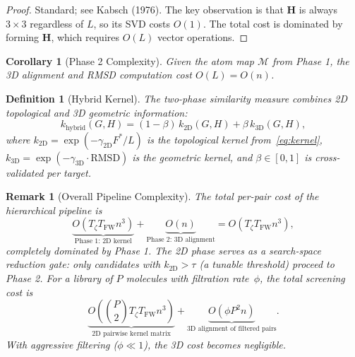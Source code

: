 \documentclass[conference]{IEEEtran}
\newtheorem{corollary}{Corollary}
\newtheorem{remark}{Remark}
\newtheorem{definition}{Definition}
\begin{document}
\begin{proof}
Standard; see Kabsch (1976).
The key observation is that $\mathbf{H}$ is always $3 \times 3$
regardless of $L$, so its SVD costs $O(1)$.
The total cost is dominated by forming $\mathbf{H}$, which
requires $O(L)$ vector operations.
\end{proof}

\begin{corollary}[Phase 2 Complexity]
\label{cor:stage2}
Given the atom map $\mathcal{M}$ from Phase 1, the 3D
alignment and RMSD computation cost $O(L) = O(n)$.
\end{corollary}

\begin{definition}[Hybrid Kernel]
\label{def:hybrid}
The two-phase similarity measure combines 2D topological
and 3D geometric information:
\begin{equation}
k_{\text{hybrid}}(G, H)
  = (1 - \beta)\, k_{\text{2D}}(G, H)
  + \beta\, k_{\text{3D}}(G, H),
\label{eq:hybrid-kernel}
\end{equation}
where
$k_{\text{2D}} = \exp(-\gamma_{\text{2D}} F^*/L)$ is the
topological kernel from~\eqref{eq:kernel},
$k_{\text{3D}} = \exp(-\gamma_{\text{3D}} \cdot \mathrm{RMSD})$
is the geometric kernel,
and $\beta \in [0,1]$ is cross-validated per target.
\end{definition}

\begin{remark}[Overall Pipeline Complexity]
The total per-pair cost of the hierarchical pipeline is
\begin{equation}
\underbrace{O(T_\zeta T_{\mathrm{FW}} n^3)}_{\text{Phase 1: 2D kernel}}
+ \underbrace{O(n)}_{\text{Phase 2: 3D alignment}}
= O(T_\zeta T_{\mathrm{FW}} n^3),
\label{eq:pipeline-complexity}
\end{equation}
completely dominated by Phase 1.
The 2D phase serves as a search-space reduction gate:
only candidates with $k_{\text{2D}} > \tau$
(a tunable threshold) proceed to Phase 2.
For a library of $P$ molecules with filtration rate~$\phi$,
the total screening cost is
\begin{equation}
\underbrace{O\!\left(\binom{P}{2} T_\zeta T_{\mathrm{FW}} n^3\right)}_{\text{2D pairwise kernel matrix}}
+ \underbrace{O(\phi P^2 n)}_{\text{3D alignment of filtered pairs}}.
\label{eq:screening-cost}
\end{equation}
With aggressive filtering ($\phi \!\ll\! 1$), the 3D
cost becomes negligible.
\end{remark}
\end{document}
